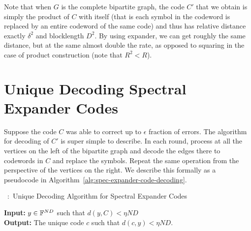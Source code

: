 \begin{remark}
Note that when $G$ is the complete bipartite graph, the code $C'$ that we obtain is simply the product of $C$ with itself (that is each symbol in the codeword is replaced by an entire codeword of the same code) and thus has relative distance exactly $\delta^2$ and blocklength $D^2$. By using expander, we can get roughly the same distance, but at the same almost double the rate, as opposed to squaring in the case of product construction (note that $R^2 < R$).
\end{remark}

\section{Unique Decoding Spectral Expander Codes}

Suppose the code $C$ was able to correct up to $\epsilon$ fraction of  errors. The algorithm for decoding of $C'$ is super simple to describe. 
In each round, process at all the vertices on the left of the bipartite graph and decode the edges there to codewords in $C$ and replace the symbols. Repeat the same operation from the perspective of the vertices on the right. We describe this formally as a pseudocode in Algorithm~\ref{alg:spec-expander-code-decoding}.

\begin{algorithm}
\caption{~:~Unique Decoding Algorithm for Spectral Expander Codes}
\label{alg:spec-expander-code-decoding}
{\bf Input:} $y \in {\mathbb{F}}^{ND}$ such that $d(y,C) < \eta ND$ \\
{\bf Output:} The unique code $c$ such that $d(c,y) < \eta ND$.
\begin{algorithmic}[1]
\Repeat
{}
\EndFor
{}
\EndFor
{}
\end{algorithmic}
\end{algorithm}

